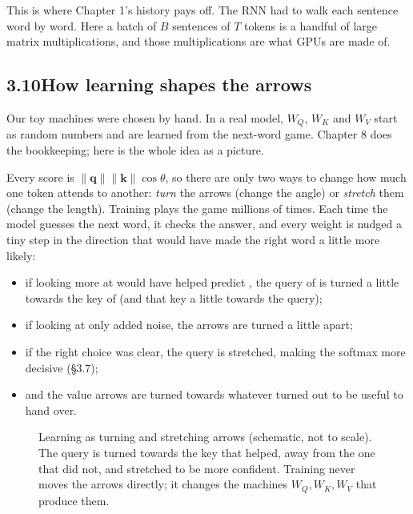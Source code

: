 \Why This is where Chapter 1's history pays off. The RNN had to walk each sentence word by word. Here a batch of $B$
sentences of $T$ tokens is a handful of large matrix multiplications, and those multiplications are what GPUs are
made of.


\subsection*{3.10\quad How learning shapes the arrows}

Our toy machines were chosen by hand. In a real model, $W_Q$, $W_K$ and $W_V$ start as random numbers and are learned
from the next-word game. Chapter 8 does the bookkeeping; here is the whole idea as a picture.

Every score is $\lVert\bm{q}\rVert\lVert\bm{k}\rVert\cos\theta$, so there are only two ways to change how much one
token attends to another: \emph{turn} the arrows (change the angle) or \emph{stretch} them (change the length).
Training plays the game millions of times. Each time the model guesses the next word, it checks the answer, and
every weight is nudged a tiny step in the direction that would have made the right word a little more likely:
\begin{itemize}
\item if looking more at  would have helped  predict , the query of  is
turned a little towards the key of  (and that key a little towards the query);
\item if looking at  only added noise, the arrows are turned a little apart;
\item if the right choice was clear, the query is stretched, making the softmax more decisive (\S3.7);
\item and the value arrows are turned towards whatever turned out to be useful to hand over.
\end{itemize}

\begin{figure}[h]
\centering
{}
\caption{Learning as turning and stretching arrows (schematic, not to scale). The query is turned towards the key
that helped, away from the one that did not, and stretched to be more confident. Training never moves the arrows
directly; it changes the machines $W_Q, W_K, W_V$ that produce them.}
\end{figure}

